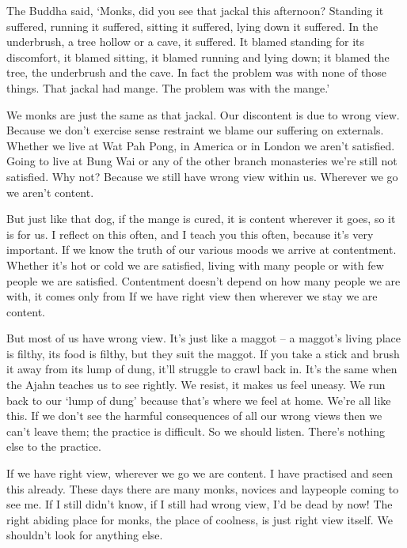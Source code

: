 The Buddha said, `Monks, did you see that jackal this afternoon? Standing it suffered, running it suffered, sitting it suffered, lying down it suffered. In the underbrush, a tree hollow or a cave, it suffered. It blamed standing for its discomfort, it blamed sitting, it blamed running and lying down; it blamed the tree, the underbrush and the cave. In fact the problem was with none of those things. That jackal had mange. The problem was with the mange.' 

We monks are just the same as that jackal. Our discontent is due to wrong view. Because we don't exercise sense restraint we blame our suffering on externals. Whether we live at Wat Pah Pong, in America or in London we aren't satisfied. Going to live at Bung Wai or any of the other branch monasteries we're still not satisfied. Why not? Because we still have wrong view within us. Wherever we go we aren't content. 

But just like that dog, if the mange is cured, it is content wherever it goes, so it is for us. I reflect on this often, and I teach you this often, because it's very important. If we know the truth of our various moods we arrive at contentment. Whether it's hot or cold we are satisfied, living with many people or with few people we are satisfied. Contentment doesn't depend on how many people we are with, it comes only from  If we have right view then wherever we stay we are content. 

But most of us have wrong view. It's just like a maggot -- a maggot's living place is filthy, its food is filthy, but they suit the maggot. If you take a stick and brush it away from its lump of dung, it'll struggle to crawl back in. It's the same when the Ajahn teaches us to see rightly. We resist, it makes us feel uneasy. We run back to our `lump of dung' because that's where we feel at home. We're all like this. If we don't see the harmful consequences of all our wrong views then we can't leave them; the practice is difficult. So we should listen. There's nothing else to the practice. 

If we have right view, wherever we go we are content. I have practised and seen this already. These days there are many monks, novices and laypeople coming to see me. If I still didn't know, if I still had wrong view, I'd be dead by now! The right abiding place for monks, the place of coolness, is just right view itself. We shouldn't look for anything else. 

